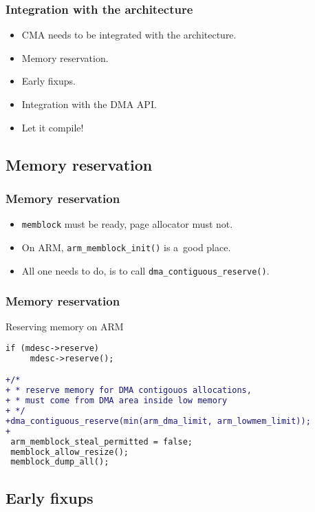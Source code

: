 \begin{frame}
  \frametitle{Integration with the architecture}

  \begin{itemize}
  \item CMA needs to be integrated with the architecture.
  \item Memory reservation.
  \item Early fixups.
  \item Integration with the DMA API.
  \item Let it compile!
  \end{itemize}
\end{frame}

\subsection{Memory reservation}

\begin{frame}
  \frametitle{Memory reservation}

  \begin{itemize}
  \item \lstinline|memblock| must be ready, page allocator must not.
  \item On ARM, \lstinline|arm_memblock_init()| is a~good place.
  \item All one needs to do, is to call
    \lstinline|dma_contiguous_reserve()|.
  \end{itemize}
\end{frame}

\begin{frame}[fragile]
  \frametitle{Memory reservation}

  \begin{block}{Reserving memory on ARM}
\begin{lstlisting}[language=diff]
 if (mdesc->reserve)
     mdesc->reserve();

+/*
+ * reserve memory for DMA contigouos allocations,
+ * must come from DMA area inside low memory
+ */
+dma_contiguous_reserve(min(arm_dma_limit, arm_lowmem_limit));
+
 arm_memblock_steal_permitted = false;
 memblock_allow_resize();
 memblock_dump_all();
\end{lstlisting}
  \end{block}
\end{frame}

\subsection{Early fixups}

